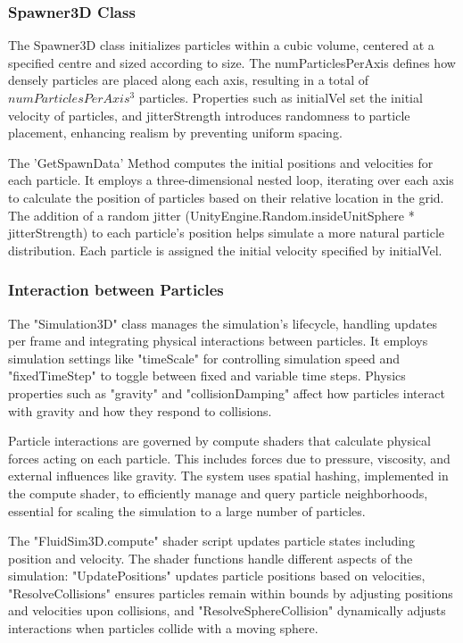 \documentclass{article}
\begin{document}
\subsubsection{Spawner3D Class}
 \hspace{1em} The Spawner3D class initializes particles within a cubic volume, centered at a specified centre and sized according to size. The numParticlesPerAxis defines how densely particles are placed along each axis, resulting in a total of $numParticlesPerAxis^3$ particles. Properties such as initialVel set the initial velocity of particles, and jitterStrength introduces randomness to particle placement, enhancing realism by preventing uniform spacing.

 The 'GetSpawnData' Method computes the initial positions and velocities for each particle. It employs a three-dimensional nested loop, iterating over each axis to calculate the position of particles based on their relative location in the grid. The addition of a random jitter (UnityEngine.Random.insideUnitSphere * jitterStrength) to each particle's position helps simulate a more natural particle distribution. Each particle is assigned the initial velocity specified by initialVel.

\subsubsection{Interaction between Particles}
 \hspace{1em} The "Simulation3D" class manages the simulation's lifecycle, handling updates per frame and integrating physical interactions between particles. It employs simulation settings like "timeScale" for controlling simulation speed and "fixedTimeStep" to toggle between fixed and variable time steps. Physics properties such as "gravity" and "collisionDamping" affect how particles interact with gravity and how they respond to collisions.

 Particle interactions are governed by compute shaders that calculate physical forces acting on each particle. This includes forces due to pressure, viscosity, and external influences like gravity. The system uses spatial hashing, implemented in the compute shader, to efficiently manage and query particle neighborhoods, essential for scaling the simulation to a large number of particles.

 The "FluidSim3D.compute" shader script updates particle states including position and velocity. The shader functions handle different aspects of the simulation: "UpdatePositions" updates particle positions based on velocities, "ResolveCollisions" ensures particles remain within bounds by adjusting positions and velocities upon collisions, and "ResolveSphereCollision" dynamically adjusts interactions when particles collide with a moving sphere.
\end{document}
